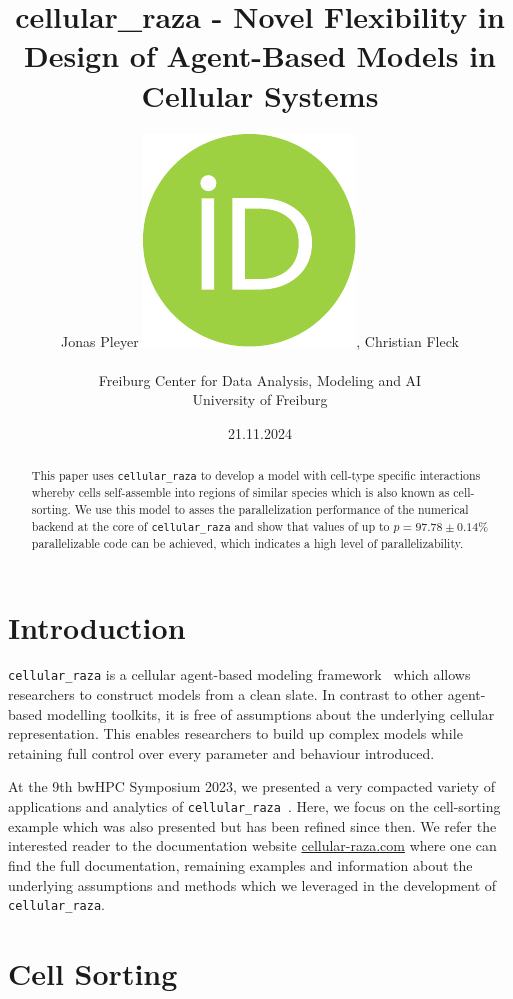 \documentclass[fontsize=11pt,a4paper]{article}
\title{cellular\_raza - Novel Flexibility in Design of Agent-Based Models in Cellular Systems}
\author{
    Jonas Pleyer
    \href{https://orcid.org/0009-0001-0613-7978}{\includegraphics[scale=0.06]{figures/orcid.pdf}},
    Christian Fleck\\\\
    Freiburg Center for Data Analysis, Modeling and AI\\
    University of Freiburg
}
\date{21.11.2024}
\begin{document}
\maketitle

%
%

\begin{abstract}
    This paper uses \texttt{cellular\_raza} to develop a model with cell-type specific interactions
    whereby cells self-assemble into regions of similar species which is also known as cell-sorting.
    We use this model to asses the parallelization performance of the numerical backend at the core
    of \texttt{cellular\_raza} and show that values of up to $p=97.78\pm0.14\%$ parallelizable code
    can be achieved, which indicates a high level of parallelizability.
\end{abstract}

\section{Introduction}\label{introduction}

\texttt{cellular\_raza} is a cellular agent-based modeling framework~\cite{Pleyer2023} which 
allows researchers to construct models from a clean slate.
In contrast to other agent-based modelling toolkits, it is free of assumptions about the underlying
cellular representation.
This enables researchers to build up complex models while retaining full control over every
parameter and behaviour introduced.

At the 9th bwHPC Symposium 2023, we presented a very compacted variety of applications and analytics
of \texttt{cellular\_raza}~\cite{PeaceOfPostersbwHPC}.
Here, we focus on the cell-sorting example which was also presented but has been refined since then.
We refer the interested reader to the documentation website
\href{https://cellular-raza.com}{cellular-raza.com} where one can find the full documentation,
remaining examples and information about the underlying assumptions and methods which we leveraged
in the development of \texttt{cellular\_raza}.

\section{Cell Sorting}
\label{sec:cell-sorting}
\end{document}
